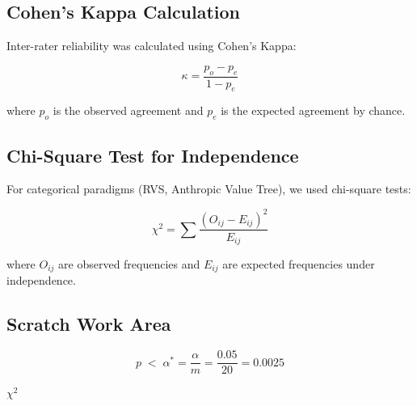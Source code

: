 \subsection{Cohen's Kappa Calculation}
Inter-rater reliability was calculated using Cohen's Kappa:

\[
\kappa = \frac{p_o - p_e}{1 - p_e}
\]

where $p_o$ is the observed agreement and $p_e$ is the expected agreement by chance.

\subsection{Chi-Square Test for Independence}
For categorical paradigms (RVS, Anthropic Value Tree), we used chi-square tests:

\[
\chi^2 = \sum \frac{(O_{ij} - E_{ij})^2}{E_{ij}}
\]

where $O_{ij}$ are observed frequencies and $E_{ij}$ are expected frequencies under independence.

\subsection{Scratch Work Area}


\[
p \;<\; \alpha^* = \frac{\alpha}{m} = \frac{0.05}{20} = 0.0025
\]

$\chi^2$



